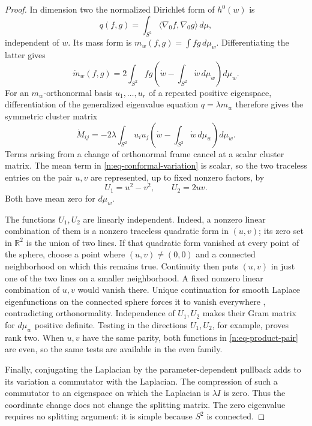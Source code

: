 \begin{proof}
In dimension two the normalized Dirichlet form of \(h^0(w)\) is
\[
 q(f,g)=\int_{S^2}\langle\nabla_0 f,\nabla_0g\rangle\,d\mu,
\]
independent of \(w\).  Its mass form is
\(m_w(f,g)=\int f g\,d\mu_w\).  Differentiating the latter gives
\[
 \dot m_w(f,g)=
 2\int_{S^2}fg
    \left(\dot w-\int_{S^2}\dot w\,d\mu_w\right)d\mu_w.
\]
For an \(m_w\)-orthonormal basis \(u_1,\ldots,u_r\) of a repeated
positive eigenspace, differentiation of the generalized eigenvalue
equation \(q=\lambda m_w\) therefore gives the symmetric cluster matrix
\begin{equation}\label{n:eq-conformal-variation}
 \dot M_{ij}=
 -2\lambda\int_{S^2}u_i u_j
       \left(\dot w-\int_{S^2}\dot w\,d\mu_w\right)d\mu_w .
\end{equation}
Terms arising from a change of orthonormal frame cancel at a scalar
cluster matrix.  The mean term in \eqref{n:eq-conformal-variation} is
scalar, so the two traceless entries on the pair \(u,v\) are represented,
up to fixed nonzero factors, by
\begin{equation}\label{n:eq-product-pair}
 U_1=u^2-v^2,\qquad U_2=2uv.
\end{equation}
Both have mean zero for \(d\mu_w\).

The functions \(U_1,U_2\) are linearly independent.  Indeed, a nonzero
linear combination of them is a nonzero traceless quadratic form in
\((u,v)\); its zero set in \(\mathbb R^2\) is the union of two lines.
If that quadratic form vanished at every point of the sphere, choose a
point where \((u,v)\ne(0,0)\) and a connected neighborhood on which this
remains true.  Continuity then puts \((u,v)\) in just one of the two
lines on a smaller neighborhood.  A fixed nonzero linear combination of
\(u,v\) would vanish there.  Unique continuation for smooth Laplace
eigenfunctions on the connected sphere forces it to vanish everywhere
\cite[\S5, Remark~3]{AKS}, contradicting orthonormality.  Independence
of \(U_1,U_2\) makes their Gram matrix for \(d\mu_w\) positive definite.
Testing in the directions \(U_1,U_2\), for example, proves rank two.
When \(u,v\) have the same parity, both functions in
\eqref{n:eq-product-pair} are even, so the same tests are available in
the even family.

Finally, conjugating the Laplacian by the parameter-dependent pullback
adds to its variation a commutator with the Laplacian.  The compression
of such a commutator to an eigenspace on which the Laplacian is
\(\lambda I\) is zero.  Thus the coordinate change does not change the
splitting matrix.  The zero eigenvalue requires no splitting argument:
it is simple because \(S^2\) is connected.
\end{proof}

